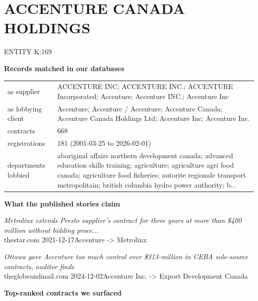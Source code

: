 \documentclass[11pt,a4paper]{article}
\newcommand{\lbl}[1]{{\color{slate}\ttfamily\footnotesize #1}}
\begin{document}
\section*{ACCENTURE CANADA HOLDINGS}
\lbl{ENTITY K:169}\quad\lbl{4 name variants}\par
\vspace{0.3em}\noindent\textbf{Records matched in our databases}\par
{\small\begin{tabular}{@{}p{3.1cm}p{13.0cm}@{}}
as supplier & ACCENTURE INC; ACCENTURE INC.; ACCENTURE Incorporated; Accenture; Accenture INC.; Accenture Inc\\
as lobbying client & Accenture; Accenture / Accenture; Accenture Canada; Accenture Canada Holdings Ltd; Accenture Inc; Accenture Inc.\\
contracts & 668\\
registrations & 181 (2001-03-25 to 2026-02-01)\\
departments lobbied & aboriginal affairs northern development canada; advanced education skills training; agriculture; agriculture agri food canada; agriculture food fisheries; autorite regionale transport metropolitain; british columbia hydro power authority; b...\\
\end{tabular}}\par
\vspace{0.6em}\noindent\textbf{What the published stories claim}\par
{\small\textit{Metrolinx extends Presto supplier's contract for three years at more than \$400 million without bidding proce...}\\
\lbl{thestar.com 2021-12-17}\quad Accenture -> Metrolinx}\par\vspace{0.25em}
{\small\textit{Ottawa gave Accenture too much control over \$313-million in CEBA sole-source contracts, auditor finds}\\
\lbl{theglobeandmail.com 2024-12-02}\quad Accenture Inc. -> Export Development Canada}\par\vspace{0.25em}
\vspace{0.6em}\noindent\textbf{Top-ranked contracts we surfaced}\par
\end{document}

